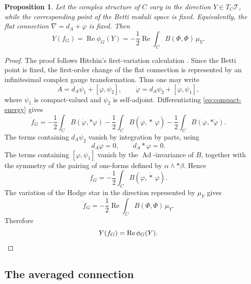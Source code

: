 \documentclass[11pt,reqno]{amsart}
\numberwithin{equation}{section}
\theoremstyle{plain}
\newtheorem{proposition}[theorem]{Proposition}
\theoremstyle{definition}
\theoremstyle{remark}
\begin{document}
\begin{proposition}
\label{prop:compact-variation}
Let the complex structure of \(C\) vary in the direction
\(Y\in T_C\mathcal T\), while the corresponding point of the Betti moduli space
is fixed.  Equivalently, the flat connection
\(
        \nabla=d_A+\varphi
\)
is fixed. Then
\[
        Y(f_G)
        =
        \operatorname{Re}\phi_G(Y)
        =
        -\frac12\operatorname{Re}
        \int_C B(\Phi,\Phi)\,\mu_Y.
\]
\end{proposition}

\begin{proof}
The proof follows Hitchin's first-variation calculation
\cite[Sec.~2]{HitchinUniversal}.  Since the Betti point is fixed, the
first-order change of the flat connection is represented by an infinitesimal
complex gauge transformation.  Thus one may write
\[
        \dot A=d_A\psi_1+[\varphi,\psi_2],
        \qquad
        \dot\varphi=d_A\psi_2+[\varphi,\psi_1],
\]
where \(\psi_1\) is compact-valued and \(\psi_2\) is self-adjoint.
Differentiating \eqref{eq:compact-energy} gives
\[
        \dot f_G
        =
        -\frac12\int_C B(\dot\varphi,*\varphi)
        -
        \frac12\int_C B(\varphi,\dot *\,\varphi)
        -
        \frac12\int_C B(\varphi,*\dot\varphi).
\]
The terms containing \(d_A\psi_2\) vanish by integration by parts, using
\[
        d_A\varphi=0,
        \qquad
        d_A{*}\varphi=0.
\]
The terms containing \([\varphi,\psi_1]\) vanish by the
\(\operatorname{Ad}\)-invariance of \(B\), together with the symmetry of the
pairing of one-forms defined by \(\alpha\wedge *\beta\).  Hence
\[
        \dot f_G
        =
        -\frac12\int_C B(\varphi,\dot *\,\varphi).
\]
The variation of the Hodge star in the direction represented by \(\mu_Y\) gives
\[
        \dot f_G
        =
        -\frac12\operatorname{Re}
        \int_C B(\Phi,\Phi)\,\mu_Y.
\]
Therefore
\[
        Y(f_G)=\operatorname{Re}\phi_G(Y). \qedhere
\]
\end{proof}

\subsection{The averaged connection}
\end{document}
